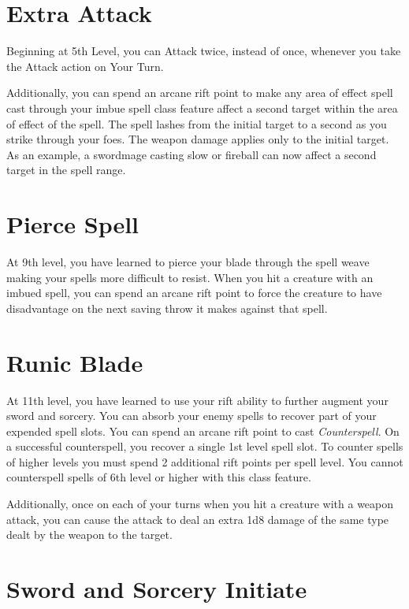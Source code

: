 \begin{multicols*}{2}
\section*{Extra Attack}

Beginning at 5th Level, you can Attack twice, instead of once, whenever you take the Attack action on Your Turn.   

Additionally, you can spend an arcane rift point to make any area of effect spell cast through your imbue spell class feature affect a second target within the area of effect of the spell. The spell lashes from the initial target to a second as you strike through your foes. The weapon damage applies only to the initial target. As an example, a swordmage casting slow or fireball can now affect a second target in the spell range. 

\section*{Pierce Spell}


At 9th level, you have learned to pierce your blade through the spell weave making your spells more difficult to resist. When you hit a creature with an imbued spell, you can spend an arcane rift point to force the creature to have disadvantage on the next saving throw it makes against that spell.


\section*{Runic Blade}


At 11th level, you have learned to use your rift ability to further augment your sword and sorcery. You can absorb your enemy spells to recover part of your expended spell slots.
You can spend an arcane rift point to cast \textit{Counterspell}.  On a successful counterspell, you recover a single 1st level spell slot. To counter spells of higher levels you must spend 2 additional rift points per spell level. 
You cannot counterspell spells of 6th level or higher with this class feature.

Additionally, once on each of your turns when you hit a creature with a weapon attack, you can cause the attack to deal an extra 1d8 damage of the same type dealt by the weapon to the target. 
    

\section*{Sword and Sorcery Initiate}



\end{multicols*}
